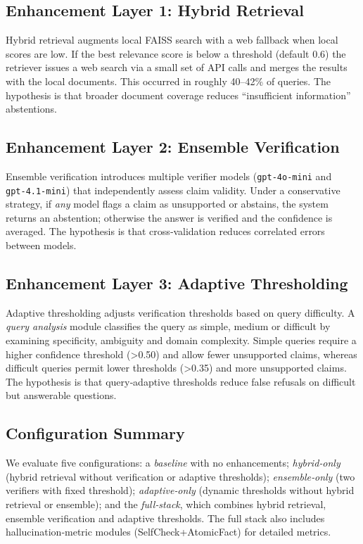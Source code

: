 \documentclass{article}
\begin{document}
\subsection{Enhancement Layer 1: Hybrid Retrieval}

Hybrid retrieval augments local FAISS search with a web fallback when local scores are low. If the best relevance score is below a threshold (default 0.6) the retriever issues a web search via a small set of API calls and merges the results with the local documents. This occurred in roughly 40–42\% of queries. The hypothesis is that broader document coverage reduces “insufficient information” abstentions.

\subsection{Enhancement Layer 2: Ensemble Verification}

Ensemble verification introduces multiple verifier models (\texttt{gpt‑4o‑mini} and \texttt{gpt‑4.1‑mini}) that independently assess claim validity. Under a conservative strategy, if \emph{any} model flags a claim as unsupported or abstains, the system returns an abstention; otherwise the answer is verified and the confidence is averaged. The hypothesis is that cross‑validation reduces correlated errors between models.

\subsection{Enhancement Layer 3: Adaptive Thresholding}

Adaptive thresholding adjusts verification thresholds based on query difficulty. A \emph{query analysis} module classifies the query as simple, medium or difficult by examining specificity, ambiguity and domain complexity. Simple queries require a higher confidence threshold (\textgreater{}0.50) and allow fewer unsupported claims, whereas difficult queries permit lower thresholds (\textgreater{}0.35) and more unsupported claims. The hypothesis is that query‑adaptive thresholds reduce false refusals on difficult but answerable questions.

\subsection{Configuration Summary}

We evaluate five configurations: a \emph{baseline} with no enhancements; \emph{hybrid‑only} (hybrid retrieval without verification or adaptive thresholds); \emph{ensemble‑only} (two verifiers with fixed threshold); \emph{adaptive‑only} (dynamic thresholds without hybrid retrieval or ensemble); and the \emph{full‑stack}, which combines hybrid retrieval, ensemble verification and adaptive thresholds. The full stack also includes hallucination‑metric modules (SelfCheck+AtomicFact) for detailed metrics.
\end{document}
